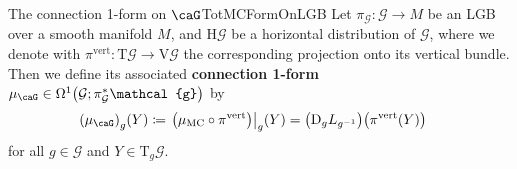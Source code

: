 \documentclass[reqno,a4paper,oneside]{amsart}
\newcommand\mutot{\mu_\caG}
\newcommand\MC{\mu_{{\rm MC}}}
\theoremstyle{plain}
\theoremstyle{remark}
\theoremstyle{definition}
\begin{document}
\begin{definitions}{The connection 1-form on $\caG$}{TotMCFormOnLGB}
Let $\pi_{\mathcal{G}}\colon\mathcal{G} \to M$ be an LGB over a smooth manifold $M$, and $\mathrm{H}\mathcal{G}$ be a horizontal distribution of $\mathcal{G}$, where we denote with $\pi^{\mathrm{vert}} \colon \mathrm{T}\mathcal{G} \to \mathrm{V}\mathcal{G}$ the corresponding projection onto its vertical bundle. Then we define its associated \textbf{connection 1-form $\mutot \in \Omega^1\mleft(\mathcal{G}; \pi_{\mathcal{G}}^*\mathcal{g}\mright)$} by
\begin{align*}
\mleft( \mutot \mright)_g(Y)
&\coloneqq
\mleft.\mleft(\MC \circ \pi^{\mathrm{vert}}\mright)\mright|_g(Y)
=
\mleft( \mathrm{D}_g L_{g^{-1}} \mright)\mleft(\pi^{\mathrm{vert}}(Y)\mright)
\end{align*}
for all $g \in \mathcal{G}$ and $Y \in \mathrm{T}_g\mathcal{G}$.
\end{definitions}
%

\end{document}
